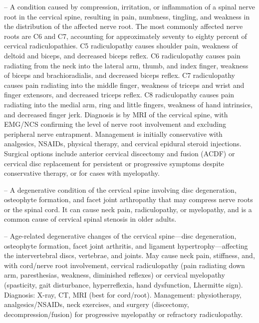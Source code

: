 -- A condition caused by compression, irritation, or inflammation of a spinal nerve root in the cervical spine, resulting in pain, numbness, tingling, and weakness in the distribution of the affected nerve root. The most commonly affected nerve roots are C6 and C7, accounting for approximately seventy to eighty percent of cervical radiculopathies. C5 radiculopathy causes shoulder pain, weakness of deltoid and biceps, and decreased biceps reflex. C6 radiculopathy causes pain radiating from the neck into the lateral arm, thumb, and index finger, weakness of biceps and brachioradialis, and decreased biceps reflex. C7 radiculopathy causes pain radiating into the middle finger, weakness of triceps and wrist and finger extensors, and decreased triceps reflex. C8 radiculopathy causes pain radiating into the medial arm, ring and little fingers, weakness of hand intrinsics, and decreased finger jerk. Diagnosis is by MRI of the cervical spine, with EMG/NCS confirming the level of nerve root involvement and excluding peripheral nerve entrapment. Management is initially conservative with analgesics, NSAIDs, physical therapy, and cervical epidural steroid injections. Surgical options include anterior cervical discectomy and fusion (ACDF) or cervical disc replacement for persistent or progressive symptoms despite conservative therapy, or for cases with myelopathy.

-- A degenerative condition of the cervical spine involving disc degeneration, osteophyte formation, and facet joint arthropathy that may compress nerve roots or the spinal cord. It can cause neck pain, radiculopathy, or myelopathy, and is a common cause of cervical spinal stenosis in older adults.

-- Age-related degenerative changes of the cervical spine—disc degeneration, osteophyte formation, facet joint arthritis, and ligament hypertrophy—affecting the intervertebral discs, vertebrae, and joints. May cause neck pain, stiffness, and, with cord/nerve root involvement, cervical radiculopathy (pain radiating down arm, paresthesias, weakness, diminished reflexes) or cervical myelopathy (spasticity, gait disturbance, hyperreflexia, hand dysfunction, Lhermitte sign). Diagnosis: X-ray, CT, MRI (best for cord/root). Management: physiotherapy, analgesics/NSAIDs, neck exercises, and surgery (discectomy, decompression/fusion) for progressive myelopathy or refractory radiculopathy.

